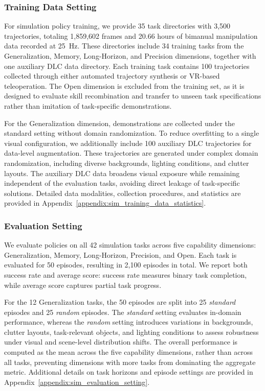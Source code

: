 \subsubsection{Training Data Setting}

For simulation policy training, we provide 35 task directories with 3,500 trajectories, totaling 1,859,602 frames and 20.66 hours of bimanual manipulation data recorded at 25~Hz. These directories include 34 training tasks from the Generalization, Memory, Long-Horizon, and Precision dimensions, together with one auxiliary DLC data directory. Each training task contains 100 trajectories collected through either automated trajectory synthesis or VR-based teleoperation. The Open dimension is excluded from the training set, as it is designed to evaluate skill recombination and transfer to unseen task specifications rather than imitation of task-specific demonstrations.

For the Generalization dimension, demonstrations are collected under the standard setting without domain randomization. To reduce overfitting to a single visual configuration, we additionally include 100 auxiliary DLC trajectories for data-level augmentation. These trajectories are generated under complex domain randomization, including diverse backgrounds, lighting conditions, and clutter layouts. The auxiliary DLC data broadens visual exposure while remaining independent of the evaluation tasks, avoiding direct leakage of task-specific solutions. Detailed data modalities, collection procedures, and statistics are provided in Appendix~\ref{appendix:sim_training_data_statistics}.

\subsubsection{Evaluation Setting}

We evaluate policies on all 42 simulation tasks across five capability dimensions: Generalization, Memory, Long-Horizon, Precision, and Open. Each task is evaluated for 50 episodes, resulting in 2,100 episodes in total. We report both success rate and average score: success rate measures binary task completion, while average score captures partial task progress.

For the 12 Generalization tasks, the 50 episodes are split into 25 \textit{standard} episodes and 25 \textit{random} episodes. The \textit{standard} setting evaluates in-domain performance, whereas the \textit{random} setting introduces variations in backgrounds, clutter layouts, task-relevant objects, and lighting conditions to assess robustness under visual and scene-level distribution shifts. The overall performance is computed as the mean across the five capability dimensions, rather than across all tasks, preventing dimensions with more tasks from dominating the aggregate metric. Additional details on task horizons and episode settings are provided in Appendix~\ref{appendix:sim_evaluation_setting}.

